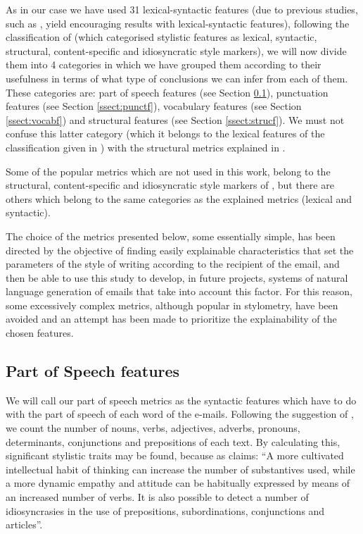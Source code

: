 As in our case we have used 31 lexical-syntactic features (due to previous studies, such as \cite{homem2011authorship}, yield encouraging results with lexical-syntactic features), following the classification of \cite{abbasi2008writeprints} (which categorised stylistic features as lexical, syntactic, structural, content-specific and idiosyncratic style markers), we will now divide them into 4 categories in which we have grouped them according to their usefulness in terms of what type of conclusions we can infer from each of them. These categories are: part of speech features (see Section \ref{ssect:posf}), punctuation features (see Section \ref{ssect:punctf}), vocabulary features (see Section \ref{ssect:vocabf}) and structural features (see Section \ref{ssect:strucf}). We must not confuse this latter category (which it belongs to the lexical features of the classification given in \cite{abbasi2008writeprints}) with the structural metrics explained in \cite{abbasi2008writeprints}.

Some of the popular metrics which are not used in this work, belong to the structural, content-specific and idiosyncratic style markers of \cite{abbasi2008writeprints}, but there are others which belong to the same categories as the explained metrics (lexical and syntactic).

The choice of the metrics presented below, some essentially simple, has been directed by the objective of finding easily explainable characteristics that set the parameters of the style of writing according to the recipient of the email, and then be able to use this study to develop, in future projects, systems of natural language generation of emails that take into account this factor. For this reason, some excessively complex metrics, although popular in stylometry, have been avoided and an attempt has been made to prioritize the explainability of the chosen features.

\subsection{Part of Speech features}\label{ssect:posf}

We will call our part of speech metrics as the syntactic features which have to do with the part of speech of each word of the e-mails. Following the suggestion of \cite{holmes1985analysis}, we count the number of nouns, verbs, adjectives, adverbs, pronouns, determinants, conjunctions and prepositions of each text. By calculating this, significant stylistic traits may be found, because as \cite{somers1966statistical} claims: ``A more cultivated intellectual habit of thinking can increase the number of substantives used, while a more dynamic empathy and attitude can be habitually expressed by means of an increased number of verbs. It is also possible to detect a number of idiosyncrasies in the use of prepositions, subordinations, conjunctions and articles''.

